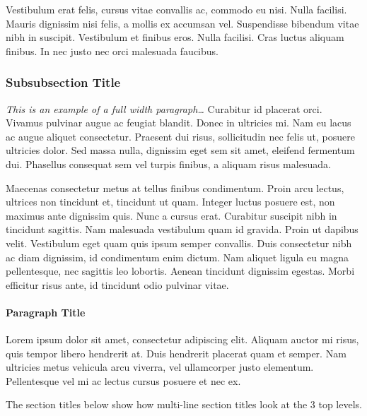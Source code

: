 \documentclass[
	letterpaper, %
	12pt, %
]{CSSullivanBusinessReport}
\begin{document}
Vestibulum erat felis, cursus vitae convallis ac, commodo eu nisi. Nulla facilisi. Mauris dignissim nisi felis, a mollis ex accumsan vel. Suspendisse bibendum vitae nibh in suscipit. Vestibulum et finibus eros. Nulla facilisi. Cras luctus aliquam finibus. In nec justo nec orci malesuada faucibus.

\subsubsection{Subsubsection Title} %

\begin{fullwidth} %
	\textit{This is an example of a full width paragraph\ldots} Curabitur id placerat orci. Vivamus pulvinar augue ac feugiat blandit. Donec in ultricies mi. Nam eu lacus ac augue aliquet consectetur. Praesent dui risus, sollicitudin nec felis ut, posuere ultricies dolor. Sed massa nulla, dignissim eget sem sit amet, eleifend fermentum dui. Phasellus consequat sem vel turpis finibus, a aliquam risus malesuada.
\end{fullwidth}

Maecenas consectetur metus at tellus finibus condimentum. Proin arcu lectus, ultrices non tincidunt et, tincidunt ut quam. Integer luctus posuere est, non maximus ante dignissim quis. Nunc a cursus erat. Curabitur suscipit nibh in tincidunt sagittis. Nam malesuada vestibulum quam id gravida. Proin ut dapibus velit. Vestibulum eget quam quis ipsum semper convallis. Duis consectetur nibh ac diam dignissim, id condimentum enim dictum. Nam aliquet ligula eu magna pellentesque, nec sagittis leo lobortis. Aenean tincidunt dignissim egestas. Morbi efficitur risus ante, id tincidunt odio pulvinar vitae.

\paragraph{Paragraph Title} %

Lorem ipsum dolor sit amet, consectetur adipiscing elit. Aliquam auctor mi risus, quis tempor libero hendrerit at. Duis hendrerit placerat quam et semper. Nam ultricies metus vehicula arcu viverra, vel ullamcorper justo elementum. Pellentesque vel mi ac lectus cursus posuere et nec ex.

The section titles below show how multi-line section titles look at the 3 top levels.
\end{document}

